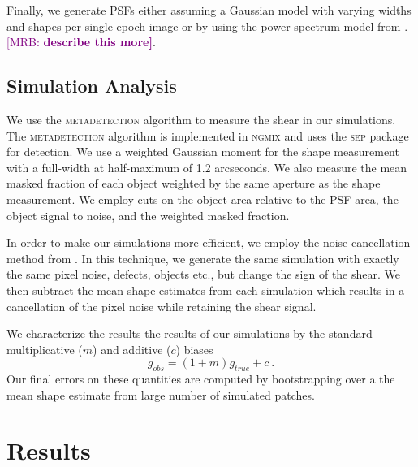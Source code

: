 \documentclass[twocolappendix, appendixfloats, numberedappendix, twocolumn, apj]{openjournal}
\newcommand{\mrb}[1]{\textcolor{purple}{[MRB: \bf #1]}\xspace}
\newcommand{\mdet}{\textsc{metadetection}\xspace}
\newcommand{\ngmix}{\textsc{ngmix}\xspace}
\newcommand{\sep}{\textsc{sep}\xspace}
\begin{document}
Finally, we generate PSFs either assuming a Gaussian model with varying widths and shapes
per single-epoch image or by using the power-spectrum model from \citep{mdet}. \mrb{describe this more}.

\subsection{Simulation Analysis}

We use the \mdet algorithm to measure the shear in our simulations. The \mdet algorithm is implemented in
\ngmix and uses the \sep package \citep{sep} for detection. We use a weighted Gaussian moment for the shape
measurement with a full-width at half-maximum of 1.2 arcseconds. We also measure the mean masked fraction
of each object weighted by the same aperture as the shape measurement. We employ cuts on the object area relative to
the PSF area, the object signal to noise, and the weighted masked fraction.

In order to make our simulations more efficient, we employ the noise cancellation method from \citet{}. In this technique,
we generate the same simulation with exactly the same pixel noise, defects, objects etc., but change the sign of
the shear. We then subtract the mean shape estimates from each simulation which results in a cancellation of
the pixel noise while retaining the shear signal.

We characterize the results the results of our simulations by the standard multiplicative ($m$) and additive ($c$) biases
\begin{equation}
g_{obs} = (1+m)g_{true} + c\ .
\end{equation}
Our final errors on these quantities are computed by bootstrapping over a the mean shape estimate from large
number of simulated patches.

\section{Results}\label{sec:results}
\end{document}
